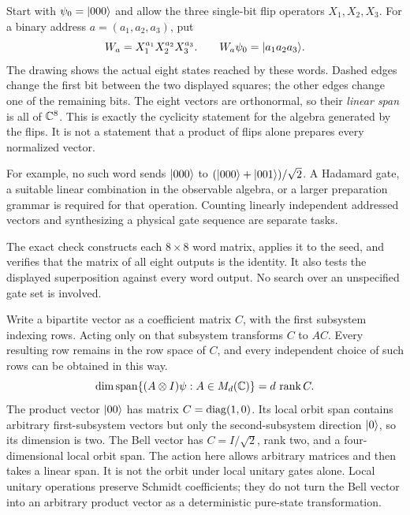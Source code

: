 Start with $\psi_0=\lvert 000\rangle$ and allow the three single-bit flip operators $X_1,X_2,X_3$. For a binary address $a=(a_1,a_2,a_3)$, put
\[
W_a=X_1^{a_1}X_2^{a_2}X_3^{a_3}.
\qquad W_a\psi_0=\lvert a_1a_2a_3\rangle.
\]
The drawing shows the actual eight states reached by these words. Dashed edges change the first bit between the two displayed squares; the other edges change one of the remaining bits.
The eight vectors are orthonormal, so their \emph{linear span} is all of $\CC^8$. This is exactly the cyclicity statement for the algebra generated by the flips. It is not a statement that a product of flips alone prepares every normalized vector.

For example, no such word sends $\lvert 000\rangle$ to $(\lvert 000\rangle+\lvert 001\rangle)/\sqrt2$. A Hadamard gate, a suitable linear combination in the observable algebra, or a larger preparation grammar is required for that operation. Counting linearly independent addressed vectors and synthesizing a physical gate sequence are separate tasks.

The exact check constructs each $8\times8$ word matrix, applies it to the seed, and verifies that the matrix of all eight outputs is the identity. It also tests the displayed superposition against every word output. No search over an unspecified gate set is involved.

Write a bipartite vector as a coefficient matrix $C$, with the first subsystem indexing rows. Acting only on that subsystem transforms $C$ to $AC$. Every resulting row remains in the row space of $C$, and every independent choice of such rows can be obtained in this way.
\[
\dim\Span\{(A\otimes I)\psi:A\in M_d(\CC)\}
=d\,\rank C.
\]
The product vector $\lvert 00\rangle$ has matrix $C=\operatorname{diag}(1,0)$. Its local orbit span contains arbitrary first-subsystem vectors but only the second-subsystem direction $\lvert 0\rangle$, so its dimension is two. The Bell vector has $C=I/\sqrt2$, rank two, and a four-dimensional local orbit span.
The action here allows arbitrary matrices and then takes a linear span. It is not the orbit under local unitary gates alone. Local unitary operations preserve Schmidt coefficients; they do not turn the Bell vector into an arbitrary product vector as a deterministic pure-state transformation.

